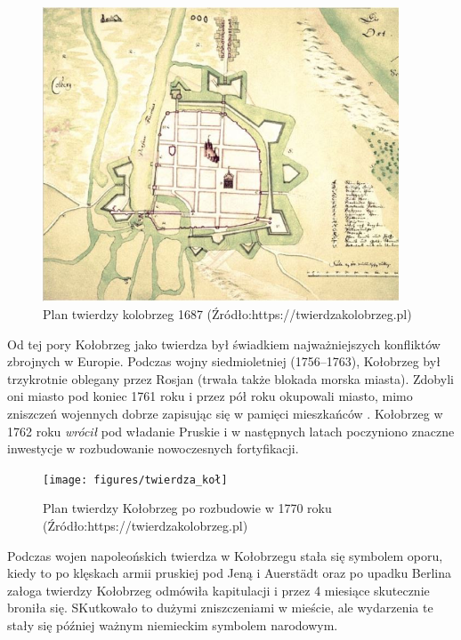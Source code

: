 \documentclass{amuthesis}
\begin{document}
\begin{figure}[t]

{\centering \includegraphics[width=400px]{figures/plan_twierdzy_kolobrzeg_1687} 

}

\caption{Plan twierdzy kolobrzeg 1687 (Źródło:https://twierdzakolobrzeg.pl)}\label{fig:ryc1}
\end{figure}

Od tej pory Kołobrzeg jako twierdza był świadkiem najważniejszych konfliktów zbrojnych w Europie.
Podczas wojny siedmioletniej (1756--1763), Kołobrzeg był trzykrotnie oblegany przez Rosjan (trwała także blokada morska miasta).
Zdobyli oni miasto pod koniec 1761 roku i przez pół roku okupowali miasto, mimo zniszczeń wojennych dobrze zapisując się w pamięci mieszkańców \autocite{historia_kołobrzeg}.
Kołobrzeg w 1762 roku \emph{wrócił} pod władanie Pruskie i w następnych latach poczyniono znaczne inwestycje w rozbudowanie nowoczesnych fortyfikacji.

\begin{figure}[t]

{\centering \texttt{[image: figures/twierdza\_koł]} 

}

\caption{Plan twierdzy Kołobrzeg po rozbudowie w 1770 roku (Źródło:https://twierdzakolobrzeg.pl)}\label{fig:ryc2}
\end{figure}

Podczas wojen napoleońskich twierdza w Kołobrzegu stała się symbolem oporu, kiedy to po klęskach armii pruskiej pod Jeną i Auerstädt oraz po upadku Berlina załoga twierdzy Kołobrzeg odmówiła kapitulacji i przez 4 miesiące skutecznie broniła się.
SKutkowało to dużymi zniszczeniami w mieście, ale wydarzenia te stały się później ważnym niemieckim symbolem narodowym.
\end{document}
